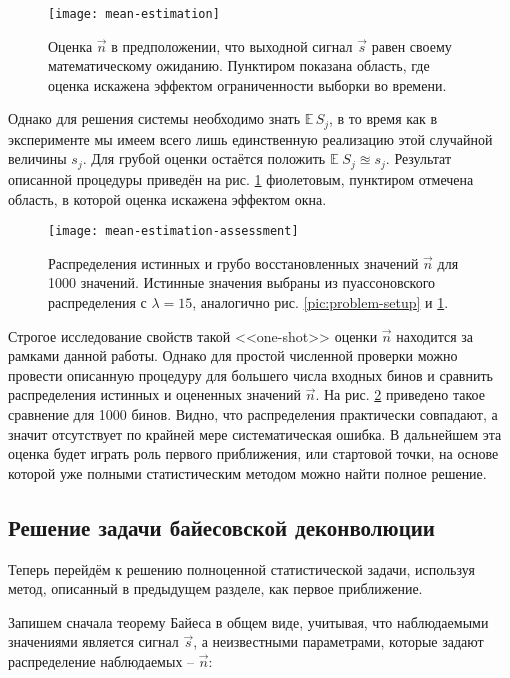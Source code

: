 \begin{figure}
	\centering
	\texttt{[image: mean-estimation]}
	\caption{Оценка $\vec{n}$ в предположении, что выходной сигнал $\vec{s}$ равен своему математическому ожиданию. Пунктиром показана область, где оценка искажена эффектом ограниченности выборки во времени.}
	\label{pic:mean-estimation}
\end{figure}

Однако для решения системы необходимо знать $\mathbb{E} \, S_j$, в то время как в эксперименте мы имеем всего лишь единственную реализацию этой случайной величины $s_j$. Для грубой оценки остаётся положить $\mathbb{E} \; S_j \approxeq s_j$. Результат описанной процедуры приведён на рис. \ref{pic:mean-estimation} фиолетовым, пунктиром отмечена область, в которой оценка искажена эффектом окна.

\begin{figure}
	\centering
	\texttt{[image: mean-estimation-assessment]}
	\caption{Распределения истинных и грубо восстановленных значений $\vec{n}$ для 1000 значений. Истинные значения выбраны из пуассоновского распределения с $\lambda = 15$, аналогично рис. \ref{pic:problem-setup} и \ref{pic:mean-estimation}.}
	\label{pic:mean-estimation-assessment}
\end{figure}

Строгое исследование свойств такой <<one-shot>> оценки $\vec{n}$ находится за рамками данной работы. Однако для простой численной проверки можно провести описанную процедуру для большего числа входных бинов и сравнить распределения истинных и оцененных значений $\vec{n}$. На рис. \ref{pic:mean-estimation-assessment} приведено такое сравнение для 1000 бинов. Видно, что распределения практически совпадают, а значит отсутствует по крайней мере систематическая ошибка. В дальнейшем эта оценка будет играть роль первого приближения, или стартовой точки, на основе которой уже полными статистическим методом можно найти полное решение.

\subsection{Решение задачи байесовской деконволюции}
\label{sec:bayesian-deconvolution-solution}

Теперь перейдём к решению полноценной статистической задачи, используя метод, описанный в предыдущем разделе, как первое приближение.

Запишем сначала теорему Байеса в общем виде, учитывая, что наблюдаемыми значениями является сигнал $\vec{s}$, а неизвестными параметрами, которые задают распределение наблюдаемых -- $\vec{n}$:


